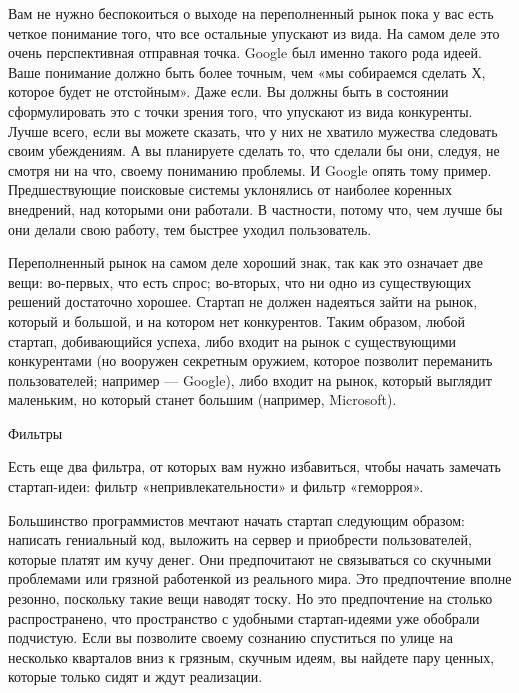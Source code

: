 \documentclass[ebook,12pt,oneside,openany]{memoir}
\begin{document}
Вам не нужно беспокоиться о выходе на переполненный рынок пока у вас
есть четкое понимание того, что все остальные упускают из вида. На
самом деле это очень перспективная отправная точка. Google был именно
такого рода идеей. Ваше понимание должно быть более точным, чем «мы
собираемся сделать Х, которое будет не отстойным». Даже если. Вы
должны быть в состоянии сформулировать это с точки зрения того, что
упускают из вида конкуренты. Лучше всего, если вы можете сказать, что
у них не хватило мужества следовать своим убеждениям. А вы планируете
сделать то, что сделали бы они, следуя, не смотря ни на что, своему
пониманию проблемы. И Google опять тому пример. Предшествующие
поисковые системы уклонялись от наиболее коренных внедрений, над
которыми они работали. В частности, потому что, чем лучше бы они
делали свою работу, тем быстрее уходил пользователь.

Переполненный рынок на самом деле хороший знак, так как это означает
две вещи: во-первых, что есть спрос; во-вторых, что ни одно из
существующих решений достаточно хорошее. Стартап не должен надеяться
зайти на рынок, который и большой, и на котором нет конкурентов. Таким
образом, любой стартап, добивающийся успеха, либо входит на рынок с
существующими конкурентами (но вооружен секретным оружием, которое
позволит переманить пользователей; например — Google), либо входит на
рынок, который выглядит маленьким, но который станет большим
(например, Microsoft).

Фильтры

Есть еще два фильтра, от которых вам нужно избавиться, чтобы начать
замечать стартап-идеи: фильтр «непривлекательности» и фильтр
«геморроя».

Большинство программистов мечтают начать стартап следующим образом:
написать гениальный код, выложить на сервер и приобрести
пользователей, которые платят им кучу денег. Они предпочитают не
связываться со скучными проблемами или грязной работенкой из реального
мира. Это предпочтение вполне резонно, поскольку такие вещи наводят
тоску. Но это предпочтение на столько распространено, что пространство
с удобными стартап-идеями уже обобрали подчистую. Если вы позволите
своему сознанию спуститься по улице на несколько кварталов вниз к
грязным, скучным идеям, вы найдете пару ценных, которые только сидят и
ждут реализации.
\end{document}
